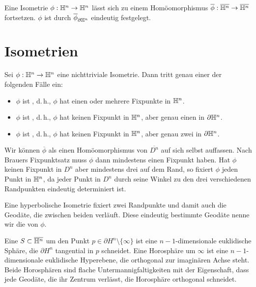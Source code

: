 \documentclass{book}
\begin{document}
\Lem{}
Eine Isometrie $\phi : \mathbb{H}^n \overset{}{\rightarrow} \mathbb{H}^n$ lässt sich zu einem Homöomorphismus $\overline{\phi} : \overline{\mathbb{H}^n} \overset{}{\rightarrow} \overline{\mathbb{H}^n} $ fortsetzen. $\phi$ ist durch $\overline{\phi}_{\partial \mathbb{H}^n}$ eindeutig festgelegt.

\section{Isometrien}
\Prop{}
Sei $\phi : \mathbb{H}^n \overset{}{\rightarrow} \mathbb{H}^n$ eine nichttriviale Isometrie. Dann tritt genau einer der folgenden Fälle ein:
\begin{itemize}
	\item $\phi$ ist , d.\,h., $\phi$ hat einen oder mehrere Fixpunkte in $\mathbb{H}^n$.
	\item $\phi$ ist , d.\,h., $\phi$ hat keinen Fixpunkt in $\mathbb{H}^n$, aber genau einen in $\partial \mathbb{H}^n$.
	\item $\phi$ ist , d.\,h., $\phi$ hat keinen Fixpunkt in $\mathbb{H}^n$, aber genau zwei in $\partial \mathbb{H}^n$.
\end{itemize}
\begin{Beweis}{}
Wir können $\overline{\phi}$ als einen Homöomorphismus von $\overline{D^n}$ auf sich selbst auffassen. Nach Brauers Fixpunktsatz muss $\phi$ dann mindestens einen Fixpunkt haben. Hat $\phi$ keinen Fixpunkt in $D^n$ aber mindestens drei auf dem Rand, so fixiert $\phi$ jeden Punkt in $\mathbb{H}^n$, da jeder Punkt in $D^n$ durch seine Winkel zu den drei verschiedenen Randpunkten eindeutig determiniert ist.
\end{Beweis}

\Def{}
Eine hyperbolische Isometrie fixiert zwei Randpunkte und damit auch die Geodäte, die zwischen beiden verläuft. Diese eindeutig bestimmte Geodäte nenne wir die  von $\phi$.

\Def{}
Eine  $S \subset \overline{\mathbb{H}^n}$ um den Punkt $p \in \partial H^n\setminus\{\infty\}$ ist eine $n-1$-dimensionale euklidische Sphäre, die $\partial H^n$ tangential in $p$ schneidet. Eine Horosphäre um $\infty$ ist eine $n-1$-dimensionale euklidische Hyperebene, die orthogonal zur imaginären Achse steht.\\
Beide Horosphären sind flache Untermannigfaltigkeiten mit der Eigenschaft, dass jede Geodäte, die ihr Zentrum verlässt, die Horosphäre orthogonal schneidet.
\end{document}
